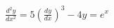 \documentclass[preview]{standalone}
\begin{document}
\begin{align*}
\frac{d^2y}{dx^2} = 5 \left( \frac{dy}{dx} \right)^3 -4y = e^x
\end{align*}
\end{document}
